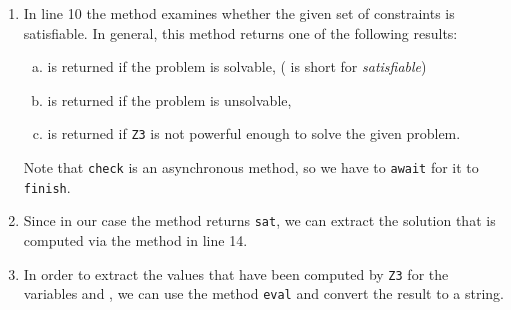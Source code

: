 \begin{enumerate}
      Unfortunately, \textsl{TypeScript} does not support operator overloading.  Therefore, we have to use the
      following methods:
      \begin{enumerate}[(a)]
      \item $x\texttt{.add}(y)$ computes $x + y$,
      \item $x\texttt{.sub}(y)$ computes $x - y$,
      \item $x\texttt{.mul}(y)$ computes $x * y$,
      \item $x\texttt{.div}(y)$ computes $x / y$,
      \item $x\texttt{.eq}(y)$ computes $x = y$,
      \item $x\texttt{.neq}(y)$ computes $x \not= y$,
      \item $x\texttt{.le}(y)$ computes $x \leq y$,
      \item $x\texttt{.ge}(y)$ computes $x \geq y$,
      \item $x\texttt{.lt}(y)$ computes $x < y$,
      \item $x\texttt{.gt}(y)$ computes $x > y$,
      \end{enumerate}
\item In line 10 the method  examines whether the given set of constraints is satisfiable.
      In general, this method returns one of the following results:
      \begin{enumerate}[(a)]
      \item {} is returned if the problem is solvable, ( is short for \emph{satisfiable})
      \item {} is returned if the problem is unsolvable,
      \item {} is returned if \texttt{Z3} is not powerful enough to solve the given problem.
      \end{enumerate}
      Note that \texttt{check} is an asynchronous method, so we have to \texttt{await} for it to \texttt{finish}.
      
\item Since in our case the method  returns \texttt{sat}, we can extract the solution that is
      computed via the method  in line 14.  
\item In order to extract the values that have been computed by \texttt{Z3} for the variables  and
      , we can use the method \texttt{eval} and convert the result to a string.
\end{enumerate}
\pagebreak

